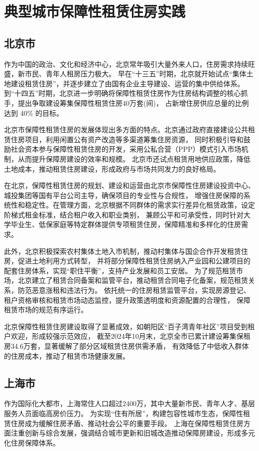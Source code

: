 \section{典型城市保障性租赁住房实践}
\subsection{北京市}
作为中国的政治、文化和经济中心，北京常年吸引大量外来人口，住房需求持续旺盛，新市民、青年人租房压力极大。
早在“十三五”时期，北京就开始试点“集体土地建设租赁住房”，并逐步建立了由国有企业主导建设、运营的集中供给体系。
到“十四五”时期，北京进一步明确将保障性租赁住房作为住房结构调整的核心抓手，提出争取建设筹集保障性租赁住房40万套(间)，
占新增住房供应总量的比例达到 40\% 的目标。

北京市保障性租赁住房的发展体现出多方面的特点。北京通过政府直接建设公共租赁住房项目，利用闲置公有资产改造等多渠道筹集住房资源，
同时积极引导和鼓励社会资本参与保障性租赁住房的开发，采用公私合营（PPP）模式引入市场机制，从而提升保障房建设的效率和规模。
北京市还试点租赁用地供应政策，降低土地成本，推动租赁住房建设，形成政府与市场共同发力的良好格局。

在北京，保障性租赁住房的规划、建设和运营由北京市保障性住房建设投资中心、城投集团等国有平台公司主导，确保项目的专业性与合规性，
增强住房保障的系统性和稳定性。在管理方面，北京根据不同群体的需求实行差异化租赁政策，设定阶梯式租金标准，结合租户收入和职业类别，
兼顾公平和可承受性，同时针对大学毕业生、低保家庭等特定群体提供专项租赁住房，保障精准和多样化的住房需求。

此外，北京积极探索农村集体土地入市机制，推动村集体与国企合作开发租赁住房，促进土地利用方式转型，
并将部分保障性租赁住房纳入产业园和公建项目的配套住房体系，实现“职住平衡”，支持产业发展和员工安居。
为了规范租赁市场，北京建立了租赁合同备案和监管平台，推动租赁合同电子化备案，规范租赁关系，防范恶意涨租和违法行为。
依托统一的住房租赁监管平台，实现房源登记、租户资格审核和租赁市场动态监控，提升政策透明度和资源配置的合理性，
保障租赁市场的规范有序运行。

北京保障性租赁住房建设取得了显著成效，如朝阳区“百子湾青年社区”项目受到租户欢迎，形成较强示范效应，
截至2024年10月末，北京全市已累计建设筹集保租房34.6万套，显著缓解了部分区域租赁住房供需矛盾，
有效降低了中低收入群体的住房成本，推动了租赁市场健康发展。

\subsection{上海市}
作为国际化大都市，上海常住人口超过2400万，其中大量新市民、青年人才、基层服务人员面临高房价压力。
为实现“住有所居”，构建包容性城市生态，保障性租赁住房成为缓解住房矛盾、推动社会公平的重要手段。
上海在保障性租赁住房方面注重创新与综合发展，强调结合城市更新和旧城改造推动保障房建设，形成多元化住房保障体系。

